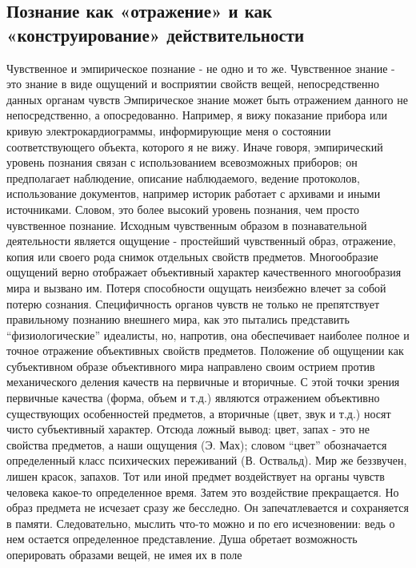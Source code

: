 \documentclass[12pt]{article}
\begin{document}
\subsection{Познание как «отражение» и как «конструирование» действительности}
Чувственное и эмпирическое познание - не одно и то же. Чувственное знание - это знание в виде ощущений и
восприятии свойств вещей, непосредственно данных органам чувств
Эмпирическое знание может быть отражением данного не непосредственно, а опосредованно. Например, я
вижу  показание  прибора  или  кривую  электрокардиограммы,  информирующие  меня  о  состоянии
соответствующего  объекта,  которого  я  не  вижу.  Иначе  говоря,  эмпирический  уровень  познания  связан  с
использованием  всевозможных  приборов;  он  предполагает  наблюдение,  описание  наблюдаемого,  ведение
протоколов, использование документов, например историк работает с архивами и иными источниками. Словом,
это более высокий уровень познания, чем просто чувственное познание.
Исходным  чувственным  образом  в  познавательной  деятельности  является  ощущение  -  простейший
чувственный образ, отражение, копия или своего рода снимок отдельных свойств предметов. Многообразие
ощущений верно отображает объективный характер качественного многообразия мира и вызвано им. Потеря
способности ощущать неизбежно влечет за собой потерю сознания.
Специфичность органов чувств не только не препятствует правильному познанию внешнего мира, как это
пытались представить “физиологические” идеалисты, но, напротив, она обеспечивает наиболее полное и точное
отражение объективных свойств предметов.
Положение  об  ощущении  как  субъективном  образе  объективного  мира  направлено  своим  острием  против
механического деления качеств на первичные и вторичные. С этой точки зрения первичные качества (форма,
объем и т.д.) являются отражением объективно существующих особенностей предметов, а вторичные (цвет, звук
и т.д.) носят чисто субъективный характер. Отсюда ложный вывод: цвет, запах - это не свойства предметов, а
наши ощущения (Э.  Мах);  словом  “цвет” обозначается  определенный  класс психических переживаний  (В.
Оствальд). Мир же беззвучен, лишен красок, запахов.
Тот  или  иной  предмет  воздействует  на  органы  чувств  человека  какое-то  определенное  время.  Затем  это
воздействие  прекращается.  Но  образ  предмета  не  исчезает  сразу  же  бесследно.  Он  запечатлевается  и
сохраняется в памяти. Следовательно, мыслить что-то можно и по его исчезновении: ведь о нем остается
определенное представление. Душа обретает возможность оперировать образами вещей, не имея их в поле
\end{document}

